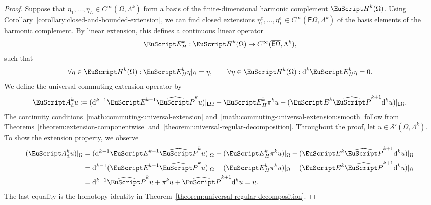 \documentclass[10pt,a4paper]{amsart}
\theoremstyle{definition}
\theoremstyle{remark}
\numberwithin{equation}{section}
\newcommand{\calS}{{\mathcal S}}
\newcommand{\euA}{{\EuScript A}}
\newcommand{\euE}{{\EuScript E}}
\newcommand{\euH}{{\EuScript H}}
\newcommand{\euP}{{\EuScript P}}
\newcommand{\sfE}{{\mathsf E}}
\newcommand{\closure}{\overline}
\renewcommand{\restriction}{|}
\newcommand{\cartan}{{\mathrm d}}
\newcommand{\Domain}{{\Omega}}
\newcommand{\extDomain}{{\sfE\Omega}}
\newcommand{\Alt}[1]{\Lambda^{#1}}
\newcommand{\Proj}{\pi}
\newcommand{\Poincare}{\euP}
\newcommand{\Extension}{\euE}
\newcommand{\kommErweiterung}{\euA_{\cartan}}
\newcommand{\Harmonic}{{\euH}}
\begin{document}
\begin{proof}
    Suppose that $\eta_1, \dots, \eta_L \in C^{\infty}(\closure\Domain,\Alt{k})$ form a basis of the finite-dimensional harmonic complement $\Harmonic^{k}(\Domain)$.
    Using Corollary~\ref{corollary:closed-and-bounded-extension}, we can find closed extensions $\eta^{e}_{1}, \dots, \eta^{e}_{L} \in C^{\infty}(\closure\extDomain,\Alt{k})$ of the basis elements of the harmonic complement.
    By linear extension, this defines a continuous linear operator
    \begin{align*}
        \Extension_{H}^{k} : \Harmonic^{k}(\Domain) \to C^{\infty}(\closure\extDomain,\Alt{k}),
    \end{align*}
    such that 
    \begin{align*}
        \forall \eta \in \Harmonic^{k}(\Domain)
        :
        \Extension_{H}^{k} \eta \restriction_{\Domain} = \eta, 
        \qquad 
        \forall \eta \in \Harmonic^{k}(\Domain)
        :
        \cartan^{k} \Extension_{H}^{k} \eta = 0
        .
    \end{align*}
    We define the universal commuting extension operator by
    \begin{align*}
        \kommErweiterung^{k} u := 
        ( \cartan^{k-1} \Extension^{k-1} \widehat\Poincare^{k} u ) \restriction_{\extDomain}
        + 
        \Extension_{H}^{k} \Proj^{k} u
        + 
        ( \Extension^{k} \widehat\Poincare^{k+1} \cartan^{k} u ) \restriction_{\extDomain}
        .
    \end{align*}
    The continuity conditions~\eqref{math:commuting-universal-extension} and~\eqref{math:commuting-universal-extension:smooth} follow from Theorems~\ref{theorem:extension-componentwise} and~\ref{theorem:universal-regular-decomposition}.
    Throughout the proof, let $u \in \calS'(\Domain,\Alt{k})$. 
    To show the extension property, we observe 
    \begin{align*}
        ( \kommErweiterung^{k} u ) \restriction_{\Domain}
        &
        =
        ( \cartan^{k-1} \Extension^{k-1} \widehat\Poincare^{k} u ) \restriction_{\Domain}
        + 
        ( \Extension_{H}^{k} \Proj^{k} u ) \restriction_{\Domain}
        + 
        ( \Extension^{k} \widehat\Poincare^{k+1} \cartan^{k} u ) \restriction_{\Domain}
        \\&
        =
        \cartan^{k-1} ( \Extension^{k-1} \widehat\Poincare^{k} u ) \restriction_{\Domain}
        + 
        ( \Extension_{H}^{k} \Proj^{k} u ) \restriction_{\Domain}
        + 
        ( \Extension^{k} \widehat\Poincare^{k+1} \cartan^{k} u ) \restriction_{\Domain}
        \\&
        =
        \cartan^{k-1} \widehat\Poincare^{k} u
        + 
        \Proj^{k} u
        + 
        \widehat\Poincare^{k+1} \cartan^{k} u
        =
        u
        .
    \end{align*}
    The last equality is the homotopy identity in Theorem~\ref{theorem:universal-regular-decomposition}.


\end{proof}
\end{document}
